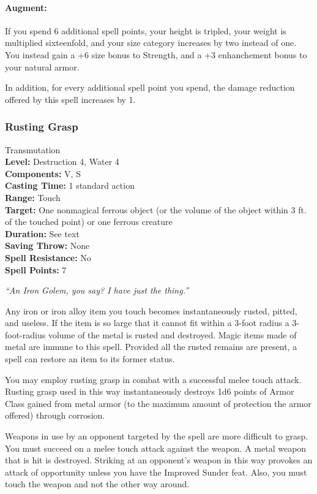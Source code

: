 \paragraph{Augment:} If you spend 6 additional spell points, 
your height is tripled, your weight is multiplied sixteenfold, 
and your size category increases by two instead of one.
You instead gain a +6 size bonus to Strength, and a +3 enhanchement bonus to your natural armor.

In addition, for every additional spell point you spend, 
the damage reduction offered by this spell increases by 1.

\subsubsection{Rusting Grasp}
\label{Spell:RustingGrasp}
Transmutation
\\ \textbf{Level:} Destruction 4, Water 4
\\ \textbf{Components:} V, S
\\ \textbf{Casting Time:} 1 standard action
\\ \textbf{Range:} Touch
\\ \textbf{Target:} One nonmagical ferrous object (or the volume of the object within 3 ft. of the touched point) or one ferrous creature
\\ \textbf{Duration:} See text
\\ \textbf{Saving Throw:} None
\\ \textbf{Spell Resistance:} No
\\ \textbf{Spell Points:} 7

\emph{``An Iron Golem, you say? I have just the thing.''}

Any iron or iron alloy item you touch becomes instantaneously rusted, pitted, and useless. If the item is so large that it cannot fit within a 3-foot radius a 3-foot-radius volume of the metal is rusted and destroyed. Magic items made of metal are immune to this spell.
Provided all the rusted remains are present, a  spell can restore an item to its former status.

You may employ rusting grasp in combat with a successful melee touch attack. Rusting grasp used in this way instantaneously destroys 1d6 points of Armor Class gained from metal armor (to the maximum amount of protection the armor offered) through corrosion.

Weapons in use by an opponent targeted by the spell are more difficult to grasp. You must succeed on a melee touch attack against the weapon. A metal weapon that is hit is destroyed.
Striking at an opponent's weapon in this way provokes an attack of opportunity unless you have the Improved Sunder feat. Also, you must touch the weapon and not the other way around.

